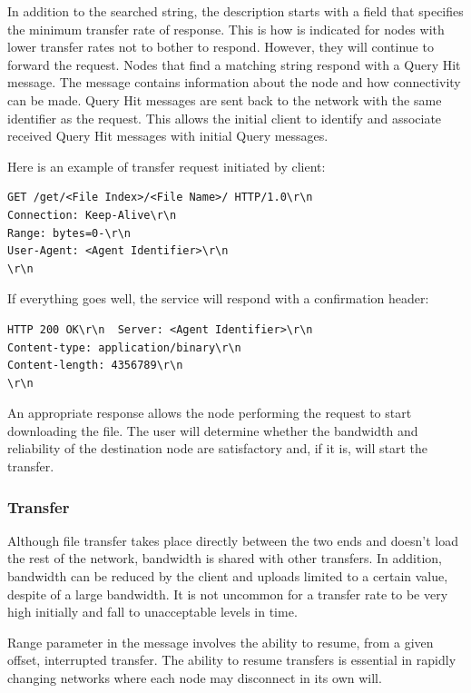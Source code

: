 In addition to the searched string, the description starts with a field that
specifies the minimum transfer rate of response. This is how is indicated for
nodes with lower transfer rates not to bother to respond. However, they will
continue to forward the request. Nodes that find a matching string respond
with a Query Hit message. The message contains information about the node and
how connectivity can be made. Query Hit messages are sent back to the network
with the same identifier as the request. This allows the initial client to
identify and associate received Query Hit messages with initial Query messages.

Here is an example of transfer request initiated by client:

\begin{verbatim}
GET /get/<File Index>/<File Name>/ HTTP/1.0\r\n
Connection: Keep-Alive\r\n
Range: bytes=0-\r\n
User-Agent: <Agent Identifier>\r\n
\r\n
\end{verbatim}

If everything goes well, the service will respond with a confirmation header:

\begin{verbatim}
HTTP 200 OK\r\n  Server: <Agent Identifier>\r\n
Content-type: application/binary\r\n
Content-length: 4356789\r\n
\r\n
\end{verbatim}

An appropriate response allows the node performing the request to start
downloading the file. The user will determine whether the bandwidth and
reliability of the destination node are satisfactory and, if it is, will start
the transfer.

\subsubsection{Transfer}

Although file transfer takes place directly between the two ends and doesn't
load the rest of the network, bandwidth is shared with other transfers. In
addition, bandwidth can be reduced by the client and uploads limited to a
certain value, despite of a large bandwidth. It is not uncommon for a transfer
rate to be very high initially and fall to unacceptable levels in time.

Range parameter in the message involves the ability to resume, from a given
offset, interrupted transfer. The ability to resume transfers is essential in
rapidly changing networks where each node may disconnect in its own will.

